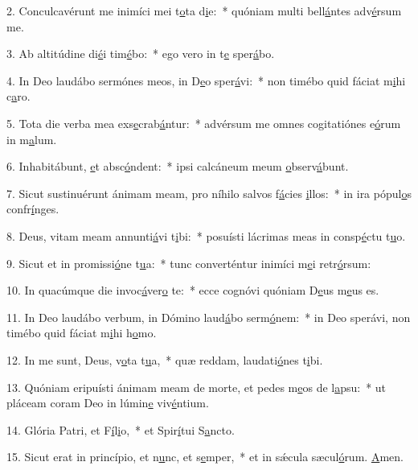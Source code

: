 2. Conculcavérunt me inimíci mei t\uline{o}ta d\uline{i}e:~* quóniam multi bell\uline{á}ntes adv\uline{é}rsum me.\par 
3. Ab altitúdine di\uline{é}i tim\uline{é}bo:~* ego vero in t\uline{e} sper\uline{á}bo.\par 
4. In Deo laudábo sermónes meos, in D\uline{e}o sper\uline{á}vi:~* non timébo quid fáciat m\uline{i}hi c\uline{a}ro.\par 
5. Tota die verba mea exs\uline{e}crab\uline{á}ntur:~* advérsum me omnes cogitatiónes e\uline{ó}rum in m\uline{a}lum.\par 
6. Inhabitábunt, \uline{e}t absc\uline{ó}ndent:~* ipsi calcáneum meum \uline{o}bserv\uline{á}bunt.\par 
7. Sicut sustinuérunt ánimam meam, pro níhilo salvos f\uline{á}cies \uline{i}llos:~* in ira pópul\uline{o}s confr\uline{í}nges.\par 
8. Deus, vitam meam annunti\uline{á}vi t\uline{i}bi:~* posuísti lácrimas meas in consp\uline{é}ctu t\uline{u}o.\par 
9. Sicut et in promissi\uline{ó}ne t\uline{u}a:~* tunc converténtur inimíci m\uline{e}i retr\uline{ó}rsum:\par 
10. In quacúmque die invoc\uline{á}ver\uline{o} te:~* ecce cognóvi quóniam D\uline{e}us m\uline{e}us es.\par 
11. In Deo laudábo verbum, in Dómino laud\uline{á}bo serm\uline{ó}nem:~* in Deo sperávi, non timébo quid fáciat m\uline{i}hi h\uline{o}mo.\par 
12. In me sunt, Deus, v\uline{o}ta t\uline{u}a,~* quæ reddam, laudati\uline{ó}nes t\uline{i}bi.\par 
13. Quóniam eripuísti ánimam meam de morte, et pedes m\uline{e}os de l\uline{a}psu:~* ut pláceam coram Deo in lúmin\uline{e} viv\uline{é}ntium.\par 
14. Glória Patri, et F\uline{í}l\uline{i}o,~* et Spir\uline{í}tui S\uline{a}ncto.\par 
15. Sicut erat in princípio, et n\uline{u}nc, et s\uline{e}mper,~* et in sǽcula sæcul\uline{ó}rum. \uline{A}men.\par 
